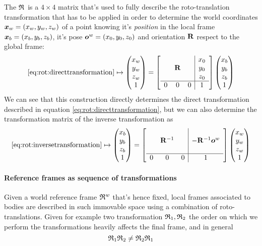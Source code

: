 		The  $\mathfrak {R}_{}$ is a $4\times 4$ matrix that's used to fully describe the roto-translation transformation that has to be applied in order to determine the world coordinates $\boldsymbol{x}_w = (x_w,y_w,z_w)$ of a point knowing it's \textit{position} in the local frame $\boldsymbol{x}_b = (x_b,y_b,z_b)$, it's pose $\boldsymbol{o}^w = (x_0,y_0,z_0)$ and orientation $\mathbf{R}$ respect to the global frame:
		\begin{equation}
				\ref{eq:rot:directtransformation}  \mapsto \begin{pmatrix} x_w \\ y_w \\ z_w \\ 1 \end{pmatrix} = \begin{bmatrix}  \begin{array}{c c c | c}
						&&& x_0 \\
						&\mathbf{R}&& y_0 \\
						&&& z_0 \\ \hline
						0&0&0&1
				\end{array} \end{bmatrix} \begin{pmatrix} x_b \\ y_b \\ z_b \\ 1 \end{pmatrix} 			
		\end{equation}
		We can see that this construction directly determines the direct transformation described in equation \ref{eq:rot:directtransformation}, but we can also determine the transformation matrix of the inverse transformation as
		\begin{equation}
				\ref{eq:rot:inversetransformation}  \mapsto \begin{pmatrix} x_b \\ y_b \\ z_b \\ 1 \end{pmatrix} = \begin{bmatrix}  \begin{array}{c c c | c}
						&&& \\
						&\mathbf{R}^{-1}&& -\mathbf{R}^{-1} \boldsymbol{o}^w \\
						&&& \\ \hline
						0&0&0&1
				\end{array} \end{bmatrix} \begin{pmatrix} x_w \\ y_w \\ z_w\\ 1 \end{pmatrix}
		\end{equation}
		
		\paragraph{Reference frames as sequence of  transformations} Given a world reference frame $\mathfrak{R}^w$ that's hence fixed, local frames associated to bodies are described in such immovable space using a combination of roto-translations. Given for example two transformation $\mathfrak {R}_{1},\mathfrak {R}_{2}$ the order on which we perform the transformations heavily affects the final frame, and in general
		\[ \mathfrak {R}_{1} \mathfrak {R}_{2} \neq \mathfrak {R}_{2}\mathfrak {R}_{1} \]
	
